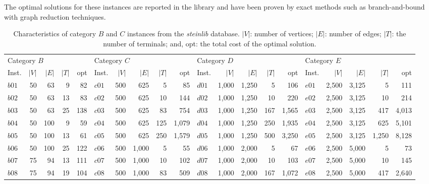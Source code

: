 \documentclass[journal]{IEEEtran}
\begin{document}
The optimal solutions for these instances are reported in the library and 
have been proven by exact methods such as branch-and-bound with graph reduction techniques.\par

\begin{table}[h]
\centering
\caption[Characteristics of category $B$, $C$, $D$ and $E$ instances from the \textit{steinlib} database]{Characteristics of category $B$ and $C$ instances from the \textit{steinlib} database. $|V|$: number of vertices; $|E|$: number of edges; $|T|$: the number of terminals; and,
         opt: the total cost of the optimal solution.}\label{tab:stpgprobs1}
\begin{adjustbox}{width=\textwidth}
\begin{tabular}{lrrrr|lrrrr|lrrrr|lrrrr} \toprule
\multicolumn{5}{l}{Category $B$} & \multicolumn{5}{l}{Category $C$}&\multicolumn{5}{l}{Category $D$} & \multicolumn{5}{l}{Category $E$}\\ 
\cmidrule(lr){1-5} \cmidrule(lr){6-10}\cmidrule(lr){11-15}\cmidrule(lr){16-20}
Inst.&$|V|$&$|E|$&$|T|$&opt& Inst.&$|V|$&$|E|$&$|T|$&opt&Inst.&$|V|$&$|E|$&$|T|$&opt& Inst.&$|V|$&$|E|$&$|T|$&opt\\ \hline
$b01$ & 50 & 63 & 9 & 82 & $c01$ & 500 & 625 & 5 & 85&  $d01$ & 1,000 & 1,250 & 5 & 106 & $e01$ & 2,500 & 3,125 & 5 & 111\\
$b02$ & 50 & 63 & 13 & 83& $c02$ & 500 & 625 & 10 & 144&  $d02$ & 1,000 & 1,250 & 10 & 220 & $e02$ & 2,500 & 3,125 & 10 & 214\\
$b03$ & 50 & 63 & 25 & 138& $c03$ & 500 & 625 & 83 & 754&  $d03$ & 1,000 & 1,250 & 167 & 1,565& $e03$ & 2,500 & 3,125 & 417 & 4,013\\
$b04$ & 50 & 100 & 9 & 59& $c04$ & 500 & 625 & 125 & 1,079&  $d04$ & 1,000 & 1,250 & 250 & 1,935& $e04$ & 2,500 & 3,125 & 625 & 5,101\\
$b05$ & 50 & 100 & 13 & 61& $c05$ & 500 & 625 & 250 & 1,579&  $d05$ & 1,000 & 1,250 & 500 & 3,250& $e05$ & 2,500 & 3,125 & 1,250 & 8,128\\
$b06$ & 50 & 100 & 25 & 122& $c06$ & 500 & 1,000 & 5 & 55&  $d06$ & 1,000 & 2,000 & 5 & 67& $e06$ & 2,500 & 5,000 & 5 & 73\\
$b07$ & 75 & 94 & 13 & 111& $c07$ & 500 & 1,000 & 10 & 102&  $d07$ & 1,000 & 2,000 & 10 & 103& $e07$ & 2,500 & 5,000 & 10 & 145\\
$b08$ & 75 & 94 & 19 & 104& $c08$ & 500 & 1,000 & 83 & 509&  $d08$ & 1,000 & 2,000 & 167 & 1,072& $e08$ & 2,500 & 5,000 & 417 & 2,640\\

\end{tabular}
\end{adjustbox}
\end{table}
\end{document}
